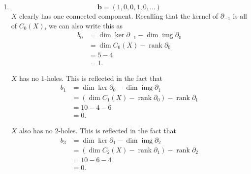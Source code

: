 \documentclass[12 pt, letterpaper]{hmcpset}
\begin{document}
\begin{solution}
\begin{enumerate}
			Let us have the following bases
			\begin{align*}
				C_{0}(X) & = \operatorname{span}([1], \dots, [4]) \\
				C_{1}(X) & = \operatorname{span}([ 0, 1 ], [ 0, 2 ], [ 0, 3 ], [ 0, 4 ], [ 1, 2 ], [ 1, 3 ], [ 1, 4 ], [ 2, 3 ], [ 2, 4 ], [ 3, 4 ]) \\
				C_{2}(X) & = \operatorname{span}([ 2, 3, 4 ], [ 1, 3, 4 ], [ 1, 2, 4 ], [ 1, 2, 3 ], [ 0, 3, 4 ], [ 0, 2, 4 ], [ 0, 2, 3 ], [ 0, 1, 4 ], [ 0, 1, 3 ], [ 0, 1, 2 ]). \\
				C_{3}(X) & = \operatorname{span}([1, 2, 3, 4], [0, 2, 3, 4], [0, 1, 3, 4], [0, 1, 2, 4], [0, 1, 2, 3])
			\end{align*}
			Again, this leads to exactly one way to write down the matrices from the formula for the boundary map. We obtain the matrices above. The ranks are obtained using computer software.

			Similarly to the previous problem, we have $\partial_{3} = 0$ since $\partial B^{4}$ is $3$-dimensional. Thus, it has $C_{4} = 0$ and $\partial_{3} : C_{4} \to C_{3}$ is really $\partial_{3} = 0$.

		\item
			\[
				\boxed{
					\mathbf{b} = (1, 0, 0, 1, 0, \dots)
				}
			\]
			$X$ clearly has one connected component. Recalling that the kernel of $\partial_{-1}$ is all of $C_{0}(X)$, we can also write this as
			\begin{align*}
				b_{0} & = \dim \ker \partial_{-1} - \dim \operatorname{img} \partial_{0} \\
				      & = \dim C_{0}(X) - \operatorname{rank} \partial_{0} \\
				      & = 5 - 4 \\
				      & = 1.
			\end{align*}

			$X$ has no $1$-holes. This is reflected in the fact that
			\begin{align*}
				b_{1} & = \dim \ker \partial_{0} - \dim \operatorname{img} \partial_{1} \\
				      & = (\dim C_{1}(X) - \operatorname{rank} \partial_{0}) - \operatorname{rank} \partial_{1} \\
				      & = 10 - 4 - 6 \\
				      & = 0.
			\end{align*}

			$X$ also has no $2$-holes. This is reflected in the fact that
			\begin{align*}
				b_{3} & = \dim \ker \partial_{1} - \dim \operatorname{img} \partial_{2} \\
				      & = (\dim C_{2}(X) - \operatorname{rank} \partial_{1}) - \operatorname{rank} \partial_{2} \\
				      & = 10 - 6 - 4 \\
				      & = 0.
			\end{align*}


\end{enumerate}
\end{solution}
\end{document}
